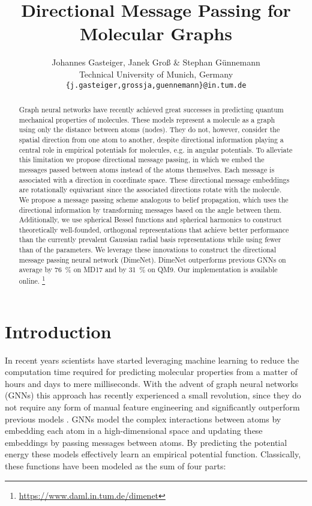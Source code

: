 \documentclass{article} \usepackage{iclr2020_conference,times}
\title{Directional Message Passing for Molecular Graphs}
\author{Johannes Gasteiger, Janek Groß \& Stephan Günnemann\\
Technical University of Munich, Germany\\
\texttt{\{j.gasteiger,grossja,guennemann\}@in.tum.de}
}
\begin{document}
\maketitle

\begin{abstract}
    Graph neural networks have recently achieved great successes in predicting quantum mechanical properties of molecules. These models represent a molecule as a graph using only the distance between atoms (nodes). They do not, however, consider the spatial direction from one atom to another, despite directional information playing a central role in empirical potentials for molecules, e.g. in angular potentials. To alleviate this limitation we propose directional message passing, in which we embed the messages passed between atoms instead of the atoms themselves. Each message is associated with a direction in coordinate space. These directional message embeddings are rotationally equivariant since the associated directions rotate with the molecule. We propose a message passing scheme analogous to belief propagation, which uses the directional information by transforming messages based on the angle between them. Additionally, we use spherical Bessel functions and spherical harmonics to construct theoretically well-founded, orthogonal representations that achieve better performance than the currently prevalent Gaussian radial basis representations while using fewer than  of the parameters. We leverage these innovations to construct the directional message passing neural network (DimeNet). DimeNet outperforms previous GNNs on average by \SI{76}{\percent} on MD17 and by \SI{31}{\percent} on QM9. Our implementation is available online. \footnote{\url{https://www.daml.in.tum.de/dimenet}}
\end{abstract}

\section{Introduction}

In recent years scientists have started leveraging machine learning to reduce the computation time required for predicting molecular properties from a matter of hours and days to mere milliseconds. With the advent of graph neural networks (GNNs) this approach has recently experienced a small revolution, since they do not require any form of manual feature engineering and significantly outperform previous models \citep{gilmer_neural_2017,schutt_schnet:_2017}. GNNs model the complex interactions between atoms by embedding each atom in a high-dimensional space and updating these embeddings by passing messages between atoms. By predicting the potential energy these models effectively learn an empirical potential function. Classically, these functions have been modeled as the sum of four parts: \citep{leach_molecular_2001}
\end{document}
